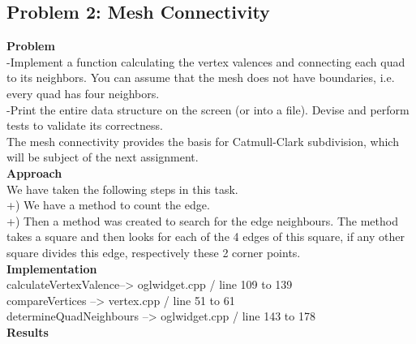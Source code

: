 \documentclass[12pt,a4paper]{scrartcl}
\begin{document}
\subsection{Problem 2: Mesh Connectivity}

\large
\textbf{Problem}\\
-Implement a function calculating the vertex valences and connecting each quad to its neighbors.
You can assume that the mesh does not have boundaries, i.e. every quad has four neighbors.\\
-Print the entire data structure on the screen (or into a file). Devise and perform tests to validate
its correctness.\\
The mesh connectivity provides the basis for Catmull-Clark subdivision, which will be subject of the
next assignment.\\[0,5cm]
\textbf{Approach}\\
We have taken the following steps in this task.\\
+) We have a method to count the edge.\\
+) Then a method was created to search for the edge neighbours. The method takes a square and then looks for each of the 4 edges of this square, if any other square divides this edge, respectively these 2 corner points.\\[0,5cm]
\textbf{Implementation}\\
calculateVertexValence--> oglwidget.cpp / line 109 to 139\\
compareVertices --> vertex.cpp / line 51 to 61\\
determineQuadNeighbours --> oglwidget.cpp / line 143 to 178\\[0,5cm]
\textbf{Results}\\
\end{document}
